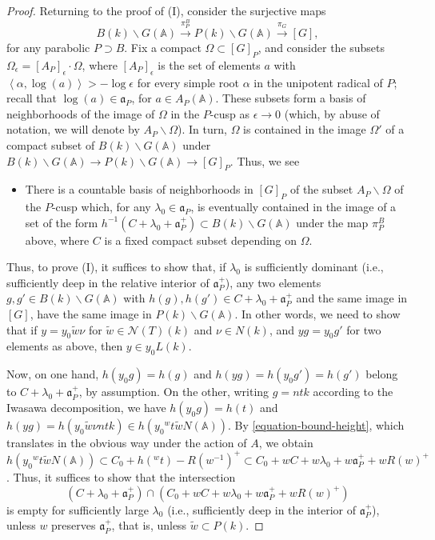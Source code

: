 \begin{proof}
Returning to the proof of (I), consider the surjective maps 
$$B(k)\backslash G(\mathbb A)\xrightarrow{\pi^B_P} P(k)\backslash G(\mathbb A) \xrightarrow{\pi_G} [G],$$ 
for any parabolic $P\supset B$. Fix a compact $\Omega\subset [G]_P$, and consider the subsets $\Omega_\epsilon= [A_P]_\epsilon \cdot \Omega$, where $[A_P]_{\epsilon}$ is the set of elements $a$ with $\left< \alpha,\log(a)\right> > -\log \epsilon$ for every simple root $\alpha$ in the unipotent radical of $P$; recall that $\log(a)\in\mathfrak a_P$, for $a\in A_P(\mathbb A)$. These subsets form a basis of neighborhoods of the image of $\Omega$ in the $P$-cusp as $\epsilon\to 0$ (which, by abuse of notation, we will denote by $A_P\backslash \Omega$). In turn, $\Omega$ is contained in the image $\Omega'$ of a compact subset of $B(k)\backslash G(\mathbb A)$ under $B(k)\backslash G(\mathbb A)\to P(k)\backslash G(\mathbb A) \to [G]_P$. Thus, we see
\begin{itemize}
 \item There is a countable basis of neighborhoods in $[G]_P$ of the subset $A_P\backslash \Omega$ of the $P$-cusp which, for any $\lambda_0\in \mathfrak a_P$, is eventually contained in  the image of a set of the form $h^{-1} (C+\lambda_0 + \mathfrak a_P^+)\subset B(k)\backslash G(\mathbb A)$ under the map $\pi^B_P$ above, where $C$ is a fixed compact subset depending on $\Omega$. 
\end{itemize}

Thus, to prove (I), it suffices to show that, if $\lambda_0$ is sufficiently dominant (i.e., sufficiently deep in the relative interior of $\mathfrak a_P^+$), any two elements $g, g'\in B(k)\backslash G(\mathbb A)$ with $h(g), h(g')\in C+\lambda_0 + \mathfrak a_P^+$ and the same image in $[G]$, have the same image in $P(k)\backslash G(\mathbb A)$. In other words, we need to show that if $y = y_0 \tilde w \nu$ for $\tilde w\in \mathcal N(T)(k)$ and $\nu\in N(k)$, and $y g = y_0 g'$ for two elements as above, then $y \in  y_0 L(k)$. 

Now, on one hand, $h(y_0g) = h(g)$ and $h(y g) = h(y_0 g') =  h(g')$ belong to $C+\lambda_0 + \mathfrak a_P^+$, by assumption. On the other, writing $g = n t k$ according to the Iwasawa decomposition, we have $h(y_0g) = h(t)$ and $h(yg) = h(y_0 \tilde w \nu ntk) \in h(y_0 {^wt} \tilde w N(\mathbb A))$. By \eqref{equation-bound-height}, which translates in the obvious way under the action of $A$, we obtain $h(y_0 {^wt} \tilde w N(\mathbb A)) \subset C_0 + h({^wt}) - R(w^{-1})^+ \subset C_0 + wC+ w\lambda_0 + w\mathfrak a_P^+ + w R(w)^+$. 
Thus, it suffices to show that the intersection
\begin{equation}
\label{equation-intersection-cones}
(C+\lambda_0 + \mathfrak a_P^+) \cap  (C_0 + wC+ w\lambda_0 + w\mathfrak a_P^+ +w R(w)^+)
\end{equation}
is empty for sufficiently large $\lambda_0$ (i.e., sufficiently deep in the interior of $\mathfrak a_P^+$), unless $w$ preserves $\mathfrak a_P^+$, that is, unless $\tilde w\subset P(k)$. 


\end{proof}
